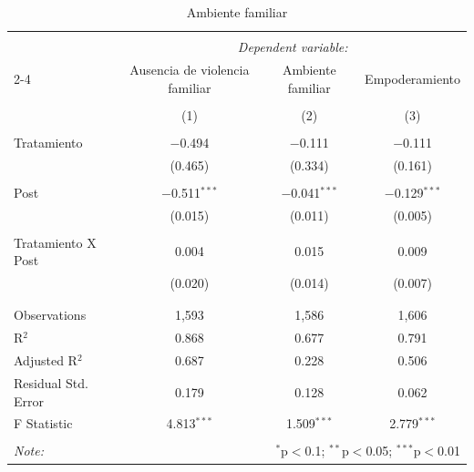 
\begin{table}[H] \centering 
  \caption{Ambiente familiar} 
  \label{reg_ambiente} 
\tiny 
\begin{tabular}{@{\extracolsep{-7pt}}lccc} 
\\[-1.8ex]\hline 
\hline \\[-1.8ex] 
 & \multicolumn{3}{c}{\textit{Dependent variable:}} \\ 
\cline{2-4} 
 & Ausencia de violencia familiar & Ambiente familiar & Empoderamiento \\ 
\\[-1.8ex] & (1) & (2) & (3)\\ 
\hline \\[-1.8ex] 
 Tratamiento & $-$0.494 & $-$0.111 & $-$0.111 \\ 
  & (0.465) & (0.334) & (0.161) \\ 
  & & & \\ 
 Post & $-$0.511$^{***}$ & $-$0.041$^{***}$ & $-$0.129$^{***}$ \\ 
  & (0.015) & (0.011) & (0.005) \\ 
  & & & \\ 
 Tratamiento X Post & 0.004 & 0.015 & 0.009 \\ 
  & (0.020) & (0.014) & (0.007) \\ 
  & & & \\ 
\hline \\[-1.8ex] 
Observations & 1,593 & 1,586 & 1,606 \\ 
R$^{2}$ & 0.868 & 0.677 & 0.791 \\ 
Adjusted R$^{2}$ & 0.687 & 0.228 & 0.506 \\ 
Residual Std. Error & 0.179 & 0.128 & 0.062 \\ 
F Statistic & 4.813$^{***}$ & 1.509$^{***}$ & 2.779$^{***}$ \\ 
\hline 
\hline \\[-1.8ex] 
\textit{Note:}  & \multicolumn{3}{r}{$^{*}$p$<$0.1; $^{**}$p$<$0.05; $^{***}$p$<$0.01} \\ 
\end{tabular} 
\end{table} 
